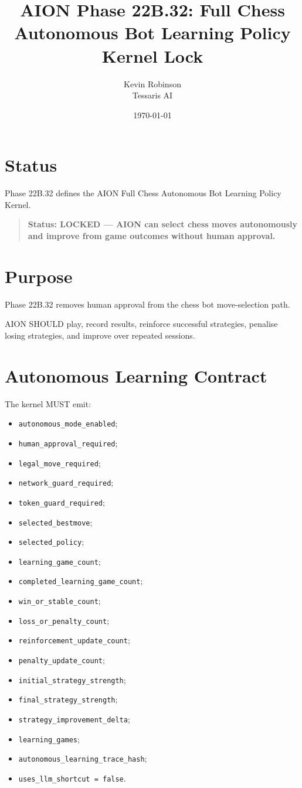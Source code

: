 \documentclass[11pt,a4paper]{article}
\title{\textbf{AION Phase 22B.32: Full Chess Autonomous Bot Learning Policy Kernel Lock}}
\author{Kevin Robinson\\Tessaris AI}
\date{\today}
\begin{document}
\maketitle

\section{Status}

Phase 22B.32 defines the AION Full Chess Autonomous Bot Learning Policy Kernel.

\begin{quote}
\textbf{Status: LOCKED --- AION can select chess moves autonomously and improve from game outcomes without human approval.}
\end{quote}

\section{Purpose}

Phase 22B.32 removes human approval from the chess bot move-selection path.

AION SHOULD play, record results, reinforce successful strategies, penalise losing strategies, and improve over repeated sessions.

\section{Autonomous Learning Contract}

The kernel MUST emit:

\begin{itemize}
  \item \texttt{autonomous\_mode\_enabled};
  \item \texttt{human\_approval\_required};
  \item \texttt{legal\_move\_required};
  \item \texttt{network\_guard\_required};
  \item \texttt{token\_guard\_required};
  \item \texttt{selected\_bestmove};
  \item \texttt{selected\_policy};
  \item \texttt{learning\_game\_count};
  \item \texttt{completed\_learning\_game\_count};
  \item \texttt{win\_or\_stable\_count};
  \item \texttt{loss\_or\_penalty\_count};
  \item \texttt{reinforcement\_update\_count};
  \item \texttt{penalty\_update\_count};
  \item \texttt{initial\_strategy\_strength};
  \item \texttt{final\_strategy\_strength};
  \item \texttt{strategy\_improvement\_delta};
  \item \texttt{learning\_games};
  \item \texttt{autonomous\_learning\_trace\_hash};
  \item \texttt{uses\_llm\_shortcut = false}.
\end{itemize}
\end{document}
